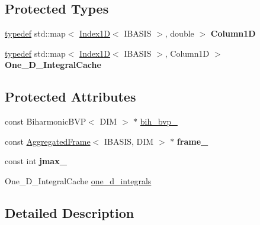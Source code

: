 \subsection*{Protected Types}
\begin{CompactItemize}
\item 
\hypertarget{classFrameTL_1_1BiharmonicEquation_357fd07037f8d50a367adbeec07a8e99}{
\hyperlink{structtypedef}{typedef} std::map$<$ \hyperlink{classFrameTL_1_1Index1D}{Index1D}$<$ IBASIS $>$, double $>$ \textbf{Column1D}}
\label{classFrameTL_1_1BiharmonicEquation_357fd07037f8d50a367adbeec07a8e99}

\item 
\hypertarget{classFrameTL_1_1BiharmonicEquation_5f4aca4d0f0e006e73fa4c1dfa9641bb}{
\hyperlink{structtypedef}{typedef} std::map$<$ \hyperlink{classFrameTL_1_1Index1D}{Index1D}$<$ IBASIS $>$, Column1D $>$ \textbf{One\_\-D\_\-IntegralCache}}
\label{classFrameTL_1_1BiharmonicEquation_5f4aca4d0f0e006e73fa4c1dfa9641bb}

\end{CompactItemize}
\subsection*{Protected Attributes}
\begin{CompactItemize}
\item 
const BiharmonicBVP$<$ DIM $>$ $\ast$ \hyperlink{classFrameTL_1_1BiharmonicEquation_31755efe61c40e44592198e134e4e2d0}{bih\_\-bvp\_\-}
\item 
\hypertarget{classFrameTL_1_1BiharmonicEquation_66b6d2b9b300fd8c2dab7f633cb938aa}{
const \hyperlink{classFrameTL_1_1AggregatedFrame}{AggregatedFrame}$<$ IBASIS, DIM $>$ $\ast$ \textbf{frame\_\-}}
\label{classFrameTL_1_1BiharmonicEquation_66b6d2b9b300fd8c2dab7f633cb938aa}

\item 
\hypertarget{classFrameTL_1_1BiharmonicEquation_70038960d2611b86152148d29c7e416d}{
const int \textbf{jmax\_\-}}
\label{classFrameTL_1_1BiharmonicEquation_70038960d2611b86152148d29c7e416d}

\item 
One\_\-D\_\-IntegralCache \hyperlink{classFrameTL_1_1BiharmonicEquation_86bca5b3462307b9a3f20cd6f84c0e0f}{one\_\-d\_\-integrals}
\end{CompactItemize}


\subsection{Detailed Description}
